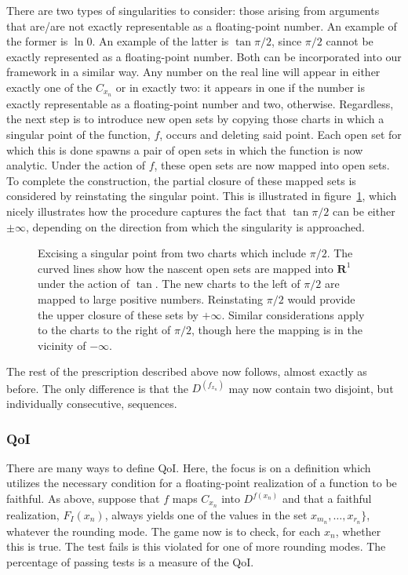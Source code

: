 \documentclass[prd,twocolumn,amsmath,amssymb,nofootinbib,eqsecnum]{revtex4-1}
\newcommand{\fig}[1]{figure~\ref{fig:#1}}
\begin{document}
There are two types of singularities to consider: those arising from arguments that are/are not exactly representable as a floating-point number. An example of the former is $\ln 0$. An example of the latter is $\tan \pi/2$, since $\pi/2$ cannot be exactly represented as a floating-point number. Both can be incorporated into our framework in a similar way. Any number on the real line will appear in either exactly one of the $C_{x_n}$ or in exactly two: it appears in one if the number is exactly representable as a floating-point number and two, otherwise. Regardless, the next step is to introduce new open sets by copying those charts in which a singular point of the function, $f$, occurs and deleting said point. Each open set for which this is done spawns a pair of open sets in which the function is now analytic. Under the action of $f$, these open sets are now mapped into open sets. To complete the construction, the partial closure of these mapped sets is considered by reinstating the singular point. This is illustrated in \fig{Singularity}, which nicely illustrates how the procedure captures the fact that $\tan \pi/2$ can be either $\pm \infty$, depending on the direction from which the singularity is approached.
\begin{figure}[h]
\begin{center}
\resizebox{25em}{!}{}
\caption{Excising a singular point from two charts which include $\pi/2$. The curved lines show how the nascent open sets are mapped into $\mathbf{R}^1$ under the action of $\tan$. The new charts to the left of $\pi/2$ are mapped to large positive numbers. Reinstating $\pi/2$ would provide the upper closure of these sets by $+\infty$. Similar considerations apply to the charts to the right of $\pi/2$, though here the mapping is in the vicinity of $-\infty$.}
\label{fig:Singularity}
\end{center}
\end{figure}

The rest of the prescription described above now follows, almost exactly as before. The only difference is that the $D^{(f_{x_n})}$ may now contain two disjoint, but individually consecutive, sequences.

\subsubsection{QoI}

There are many ways to define QoI. Here, the focus is on a definition which utilizes the necessary condition for a floating-point realization of a function to be faithful. As above, suppose that $f$
maps $C_{x_n}$ into $D^{f(x_n)}$ and that a faithful realization, $F_I(x_n)$, always yields one of the values in the set ${x_{m_n}, \ldots, x_{r_n}\}}$, whatever the rounding mode. The game now is to check,
for each $x_n$, whether this is true. The test fails is this violated for one of more rounding modes.
The percentage of passing tests is a measure of the QoI.
\end{document}
